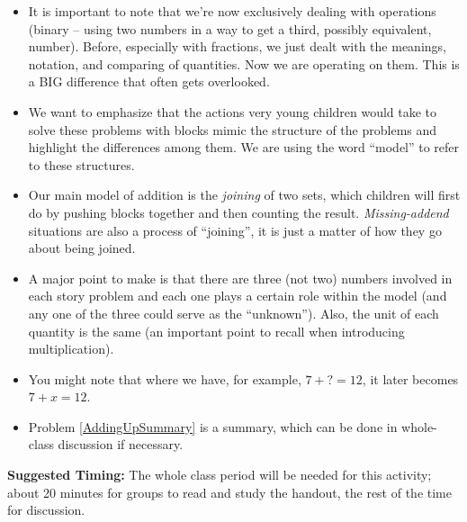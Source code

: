\documentclass{ximera}
\begin{document}
\begin{instructorNotes}
\begin{itemize}
	\item It is important to note that we're now exclusively dealing with operations (binary -- using two numbers in a way to get a third, possibly equivalent, number). Before, especially with fractions, we just dealt with the meanings, notation, and comparing of quantities.  Now we are operating on them. This is a BIG difference that often gets overlooked.
	\item We want to emphasize that the actions very young children would take to solve these problems with blocks mimic the structure of the problems and highlight the differences among them.  We are using the word ``model'' to refer to these structures.
	\item Our main model of addition is the {\em joining} of two sets, which children will first do by pushing blocks together and then counting the result.  {\em Missing-addend} situations are also a process of ``joining'', it is just a matter of how they go about being joined.
	\item A major point to make is that there are three (not two) numbers involved in each story problem and each one plays a certain role within the model (and any one of the three could serve as the ``unknown'').  Also, the unit of each quantity is the same (an important point to recall when introducing multiplication).
	\item You might note that where we have, for example, $7 + ? = 12$, it later becomes $7 + x = 12$.
	\item Problem \ref{AddingUpSummary} is a summary, which can be done in whole-class discussion if necessary.
\end{itemize}

{\bf Suggested Timing:} The whole class period will be needed for this activity; about 20 minutes for groups to read and study the handout, the rest of the time for discussion. 
\end{instructorNotes}
\end{document}
